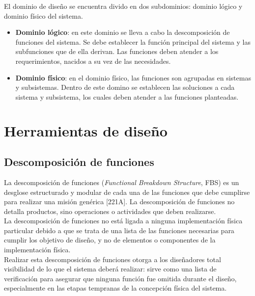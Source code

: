 \noindent El dominio de dise\~{n}o se encuentra divido en dos subdominios: dominio l\'ogico y dominio f\'isico del sistema.
\begin{itemize}
	\item \textbf{Dominio l\'ogico}: en este dominio se lleva a cabo la descomposici\'on de funciones del sistema. Se debe establecer la funci\'on principal del sistema y las subfunciones que de ella derivan. Las funciones deben atender a los requerimientos, nacidos a su vez de las necesidades. 
	\item \textbf{Dominio f\'isico}: en el dominio f\'isico, las funciones son agrupadas en sistemas y subsistemas. Dentro de este domino se establecen las soluciones a cada sistema y subsistema, los cuales deben atender a las funciones planteadas.
\end{itemize}

	\section{Herramientas de dise\~{n}o} \label{sec:tools}
		\subsection{Descomposici\'on de funciones} \label{subsec:fbs}
La descomposici\'on de funciones (\textit{Functional Breakdown Structure}, FBS) es un desglose estructurado y modular de cada una de las funciones que debe cumplirse para realizar una misi\'on gen\'erica [221A]. La descomposici\'on de funciones no detalla productos, sino operaciones o actividades que deben realizarse.\\

\noindent La descomposici\'on de funciones no est\'a ligada a ninguna implementaci\'on f\'isica particular debido a que se trata de una lista de las funciones necesarias para cumplir los objetivo de dise\~{n}o, y no de elementos o componentes de la implementaci\'on f\'isica.\\

\noindent Realizar esta descomposici\'on de funciones otorga a los dise\~{n}adores total visibilidad de lo que el sistema deber\'a realizar: sirve como una lista de verificaci\'on para asegurar que ninguna funci\'on fue omitida durante el dise\~{n}o, especialmente en las etapas tempranas de la concepci\'on f\'isica del sistema.\\


